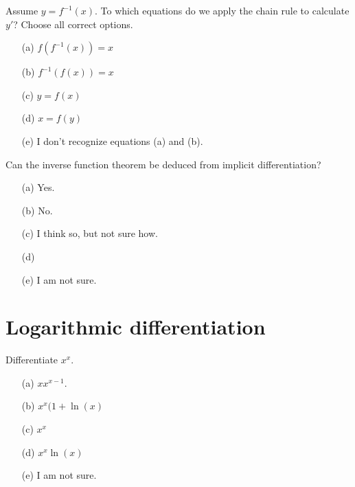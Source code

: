 \documentclass[14pt]{beamer}
\begin{document}
\begin{frame}
  Assume \(y = f^{-1}(x)\). To which equations do we apply the chain rule to calculate \(y'\)? Choose all correct options.

  \medskip
  \begin{itemize} \setlength\itemsep{2ex}
    \item[(a)] \(f(f^{-1}(x)) = x\)
    \item[(b)] \(f^{-1}(f(x)) = x\)
    \item[(c)] \(y = f(x)\)
    \item[(d)] \(x = f(y)\)
    \item[(e)] I don't recognize equations (a) and (b).
  \end{itemize} 
\end{frame}


\begin{frame}
  Can the inverse function theorem be deduced from implicit differentiation?

  \medskip
  \begin{itemize} \setlength\itemsep{2ex}
    \item[(a)] Yes.
    \item[(b)] No.
    \item[(c)] I think so, but not sure how.
    \item[(d)] 
    \item[(e)] I am not sure.
  \end{itemize} 
\end{frame}


\section{Logarithmic differentiation}
\begin{frame}
  Differentiate \(x^{x}\).

  \medskip
  \begin{itemize} \setlength\itemsep{2ex}
    \item[(a)] \(x x^{x-1}\).
    \item[(b)] \(x^{x}(1 + \ln(x)\)
    \item[(c)] \(x^{x}\)
    \item[(d)] \(x^{x}\ln(x)\)
    \item[(e)] I am not sure.
  \end{itemize} 
\end{frame}
\end{document}
